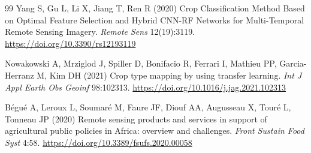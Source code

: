 \documentclass[pdflatex,sn-mathphys]{sn-jnl} %
\begin{document}
\begin{thebibliography}{99}
Yang S, Gu L, Li X, Jiang T, Ren R (2020) Crop Classification Method Based on Optimal Feature Selection and Hybrid CNN-RF Networks for Multi-Temporal Remote Sensing Imagery. \textit{Remote Sens} 12(19):3119. \href{https://doi.org/10.3390/rs12193119}{https://doi.org/10.3390/rs12193119}

Nowakowski A, Mrziglod J, Spiller D, Bonifacio R, Ferrari I, Mathieu PP, Garcia-Herranz M, Kim DH (2021) Crop type mapping by using transfer learning. \textit{Int J Appl Earth Obs Geoinf} 98:102313. \href{https://doi.org/10.1016/j.jag.2021.102313}{https://doi.org/10.1016/j.jag.2021.102313}

Bégué A, Leroux L, Soumaré M, Faure JF, Diouf AA, Augusseau X, Touré L, Tonneau JP (2020) Remote sensing products and services in support of agricultural public policies in Africa: overview and challenges. \textit{Front Sustain Food Syst} 4:58. \href{https://doi.org/10.3389/fsufs.2020.00058}{https://doi.org/10.3389/fsufs.2020.00058}

\end{thebibliography}
\end{document}
